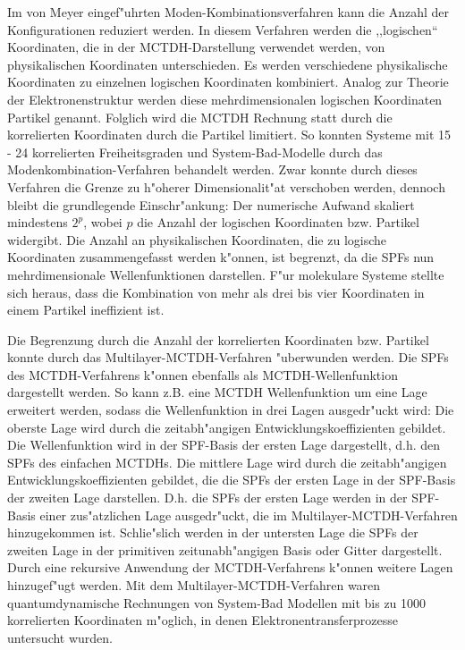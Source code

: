  Im von Meyer eingef"uhrten Moden-Kombinationsverfahren kann die Anzahl der Konfigurationen reduziert werden.
In diesem Verfah\-ren werden die ,,logischen`` Koordinaten, die in der MCTDH-Darstellung verwendet werden, von physikalischen Koordinaten unterschieden. 
Es werden verschiedene physikalische Koordinaten zu einzelnen logischen Koordinaten kombiniert.
Analog zur Theorie der Elektronenstruktur werden diese mehrdimensionalen logischen Koordinaten Partikel genannt. 
Folglich wird die MCTDH Rechnung statt durch die korrelierten Koordinaten durch die Partikel limitiert. 
So konnten Systeme  mit 15 - 24 korrelierten Freiheitsgraden \cite{H5O2+MCTDH2, H5O2+MCTDH3, RWMC, CWMC}
und System-Bad-Modelle \cite{W, WTM, NM2} durch das Modenkombination-Verfahren behandelt werden.
Zwar konnte durch dieses Verfahren die Grenze zu h"oherer Dimensionalit"at verschoben werden,
 dennoch bleibt die grundlegende Einschr"ankung: Der numerische Aufwand skaliert mindestens $2^p$, wobei $ p $ die Anzahl der logischen Koordinaten bzw.
 Partikel widergibt. Die Anzahl an physikalischen Koordinaten, die zu logische Koordinaten zusammengefasst werden k"onnen, ist begrenzt, da die SPFs
 nun mehrdimensionale Wellenfunktionen darstellen. F"ur molekulare Systeme stellte sich heraus, dass die Kombination von mehr als drei bis vier Koordinaten in einem Partikel
ineffizient ist.

Die Begrenzung durch die Anzahl der korrelierten Koordinaten bzw. Partikel konnte durch das Multilayer-MCTDH-Verfahren \cite{WT3} "uberwunden werden.
Die SPFs des MCTDH-Verfahrens k"onnen ebenfalls als MCTDH-Wellenfunktion dargestellt werden.
So kann z.B. eine MCTDH Wellenfunktion um eine Lage erweitert werden, sodass die Wellenfunktion in drei Lagen ausgedr"uckt wird:
Die oberste Lage wird durch die zeitabh"angigen Entwicklungskoeffizienten gebildet. Die Wellenfunktion wird in der SPF-Basis der ersten Lage dargestellt, d.h.
den SPFs des einfachen MCTDHs. Die mittlere Lage wird durch die zeitabh"angigen Entwicklungskoeffizienten gebildet, die die SPFs der ersten Lage in der
SPF-Basis der zweiten Lage darstellen.
D.h. die SPFs der ersten Lage werden in der SPF-Basis einer zus"atzlichen Lage ausgedr"uckt, die im Multilayer-MCTDH-Verfahren hinzugekommen ist. 
Schlie"slich werden in der untersten Lage die SPFs der zweiten Lage in der primitiven zeitunabh"angigen Basis oder Gitter dargestellt.
Durch eine rekursive Anwendung der MCTDH-Verfahrens k"onnen weitere Lagen hinzugef"ugt werden.
Mit dem Multilayer-MCTDH-Verfahren waren quantumdynamische Rechnungen von System-Bad Modellen mit bis zu 1000 korrelierten Koordinaten m"oglich,
in denen Elektronentransferprozesse \cite{WT3, WST} untersucht wurden.

